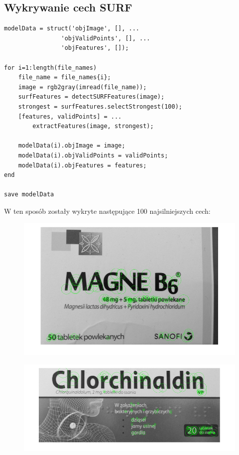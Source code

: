 \documentclass[a4paper, 12pt, titlepage]{article}
\begin{document}
        \subsection{Wykrywanie cech SURF}
\begin{lstlisting}
modelData = struct('objImage', [], ...
                'objValidPoints', [], ...
                'objFeatures', []);

for i=1:length(file_names)
    file_name = file_names{i};
    image = rgb2gray(imread(file_name));
    surfFeatures = detectSURFFeatures(image);
    strongest = surfFeatures.selectStrongest(100);
    [features, validPoints] = ... 
        extractFeatures(image, strongest);

    modelData(i).objImage = image;
    modelData(i).objValidPoints = validPoints;
    modelData(i).objFeatures = features;
end

save modelData
\end{lstlisting}
        W ten sposób zostały wykryte następujące 100 najsilniejszych cech:
        \begin{figure}[H]
            \centering
            \includegraphics[width=\linewidth]{first/a.png}
        \end{figure}
        \begin{figure}[H]
            \centering
            \includegraphics[width=\linewidth]{first/chlorchinaldin.png}
        \end{figure}
\end{document}
